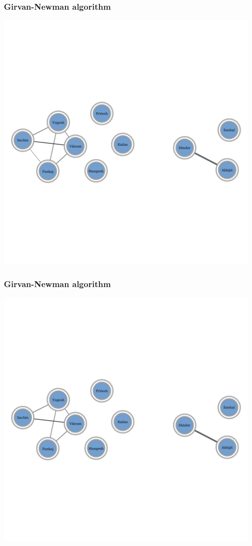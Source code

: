 \documentclass{beamer}
\begin{document}
\begin{frame}
    \frametitle{Girvan-Newman algorithm}
    \centering
    \includegraphics[width=0.8\columnwidth]{gn10.pdf}
\end{frame}
\begin{frame}
    \frametitle{Girvan-Newman algorithm}
    \centering
    \includegraphics[width=0.8\columnwidth]{gn11.pdf}
\end{frame}
\end{document}
